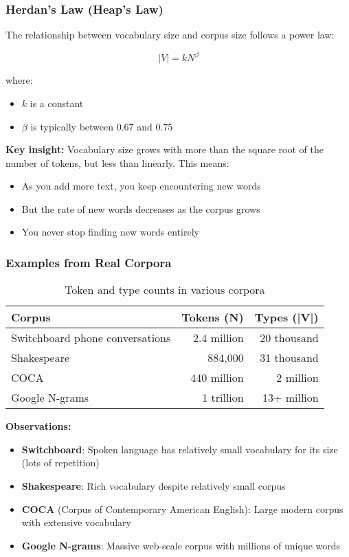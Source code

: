 \documentclass[11pt,a4paper]{article}
\theoremstyle{definition}
\theoremstyle{plain}
\theoremstyle{remark}
\begin{document}
\subsubsection{Herdan's Law (Heap's Law)}

The relationship between vocabulary size and corpus size follows a power law:

\[
|V| = kN^\beta
\]

where:
\begin{itemize}
    \item $k$ is a constant
    \item $\beta$ is typically between 0.67 and 0.75
\end{itemize}

\textbf{Key insight:} Vocabulary size grows with more than the square root of the number of tokens, but less than linearly. This means:
\begin{itemize}
    \item As you add more text, you keep encountering new words
    \item But the rate of new words decreases as the corpus grows
    \item You never stop finding new words entirely
\end{itemize}

\subsubsection{Examples from Real Corpora}

\begin{table}[h]
\centering
\begin{tabular}{|l|r|r|}
\hline
\textbf{Corpus} & \textbf{Tokens (N)} & \textbf{Types (|V|)} \\
\hline
Switchboard phone conversations & 2.4 million & 20 thousand \\
\hline
Shakespeare & 884,000 & 31 thousand \\
\hline
COCA & 440 million & 2 million \\
\hline
Google N-grams & 1 trillion & 13+ million \\
\hline
\end{tabular}
\caption{Token and type counts in various corpora}
\end{table}

\textbf{Observations:}
\begin{itemize}
    \item \textbf{Switchboard}: Spoken language has relatively small vocabulary for its size (lots of repetition)
    \item \textbf{Shakespeare}: Rich vocabulary despite relatively small corpus
    \item \textbf{COCA} (Corpus of Contemporary American English): Large modern corpus with extensive vocabulary
    \item \textbf{Google N-grams}: Massive web-scale corpus with millions of unique words
\end{itemize}
\end{document}
